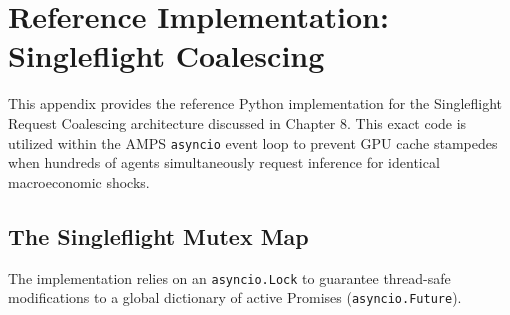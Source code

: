 \chapter{Reference Implementation: Singleflight Coalescing}
\label{ch:reference_singleflight}

This appendix provides the reference Python implementation for the Singleflight Request Coalescing architecture \cite{colakel2026singleflight} discussed in Chapter 8. This exact code is utilized within the AMPS \texttt{asyncio} event loop to prevent GPU cache stampedes when hundreds of agents simultaneously request inference for identical macroeconomic shocks.

\section{The Singleflight Mutex Map}

The implementation relies on an \texttt{asyncio.Lock} to guarantee thread-safe modifications to a global dictionary of active Promises (\texttt{asyncio.Future}).

